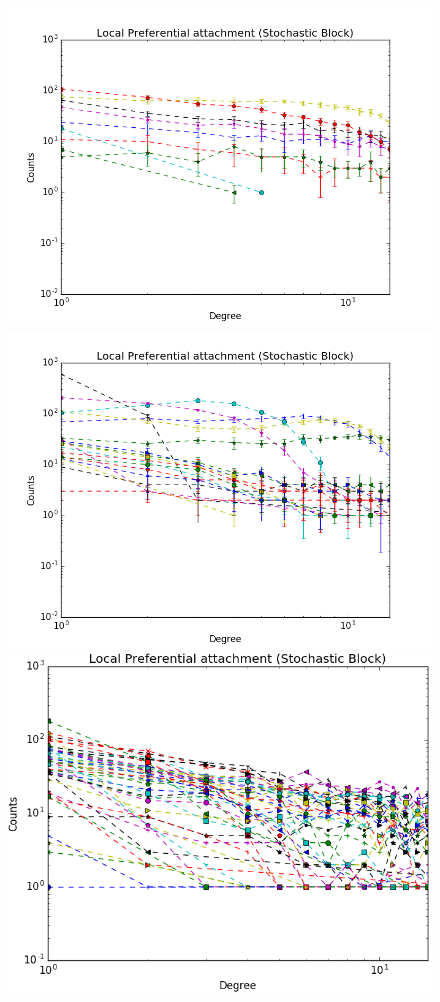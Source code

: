 \begin{figure}[ht]
	\endminipage
		\vspace{-0.29cm}
	\includegraphics[scale=0.27]{img/M_g_peaks/figure_3}
	\endminipage
	\includegraphics[scale=0.27]{img/M_g_power_law/figure_3} 
	\endminipage
	\includegraphics[scale=0.27]{img/M_g_regular/figure_3}

\end{figure}
